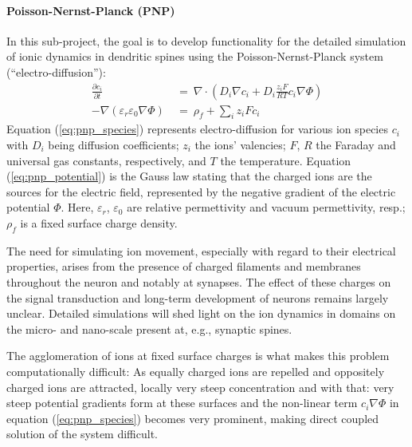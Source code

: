 \paragraph{Poisson-Nernst-Planck (PNP)}\label{subproject:PNP}
In this sub-project, the goal is to develop functionality for the detailed simulation of ionic dynamics in dendritic spines using the Poisson-Nernst-Planck system (``electro-diffusion''):
\begin{align}
  \frac{\partial c_{i}}{\partial t} \:& = \:  \nabla\cdot\left(D_{i}\nabla c_{i}+D_{i}
    \frac{z_{i}F}{RT}c_{i}\nabla\Phi\right) \label{eq:pnp_species}\\
  -\nabla(\varepsilon_{r}\varepsilon_{0}\nabla\Phi) \: & = \:
    \rho_{f}+\sum_{i}z_{i}Fc_{i} \label{eq:pnp_potential}
\end{align}
Equation (\ref{eq:pnp_species}) represents electro-diffusion for various ion species
$c_i$ with $D_i$ being diffusion coefficients; $z_i$ the ions' valencies; $F$, $R$
the Faraday and universal gas constants, respectively, and $T$ the temperature.
Equation (\ref{eq:pnp_potential}) is the Gauss law stating that the charged ions are
the sources for the electric field, represented by the negative gradient of the
electric potential $\Phi$. Here, $\varepsilon_r$, $\varepsilon_0$ are relative
permettivity and vacuum permettivity, resp.; $\rho_f$ is a fixed surface charge density.
\vspace{0.3cm}

The need for simulating ion movement, especially with regard to their
electrical properties, arises from the presence of charged filaments and membranes
throughout the neuron and notably at synapses. The effect of these charges on the
signal transduction and long-term development of neurons remains largely unclear.
Detailed simulations will shed light on the ion dynamics in domains on the micro-
and nano-scale present at, e.g., synaptic spines.

The agglomeration of ions at fixed surface charges is what makes this problem
computationally difficult: As equally charged ions are repelled and oppositely
charged ions are attracted, locally very steep concentration and with that:
very steep potential gradients form at these surfaces and the non-linear term
$c_{i}\nabla\Phi$ in equation (\ref{eq:pnp_species}) becomes very prominent,
making direct coupled solution of the system difficult.
\vspace{0.3cm}

